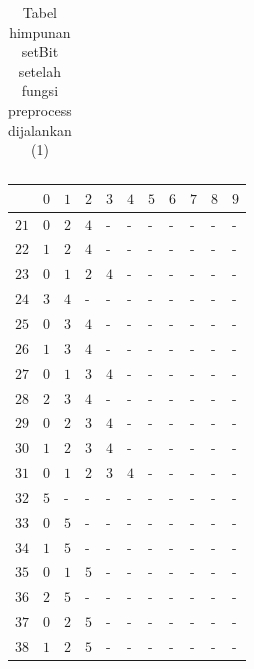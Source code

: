 \begin{appendices}
\begin{table}[H]
\begin{tabular} {|l|l|l|l|l|l|l|l|l|l|l|}
  	\end{tabular}\caption{Tabel himpunan setBit setelah fungsi preprocess dijalankan (1)}
  	\label{tab:setbit_1}
  \end{table}
  \begin{table}[H]
  	\centering
  	\begin{tabular} {|l|l|l|l|l|l|l|l|l|l|l|} \hline
  		\backslashbox{$Num$}{$index$} & $ 0 $ & $ 1 $ & $ 2 $ & $ 3 $ & $ 4 $ & $ 5 $ & $ 6 $ & $ 7 $ & $ 8 $ & $ 9 $ \\ \hline  		
  		$ 21 $ & $ 0 $ &$ 2 $ &$ 4 $ & - &  - &  - &  - &  - &  - &  -   \\ \hline
  		$ 22 $ & $ 1 $ &$ 2 $ &$ 4 $ & - &  - &  - &  - &  - &  - &  -   \\ \hline 
  		$ 23 $ & $ 0 $ &$ 1 $ &$ 2 $ &$ 4 $ & - &  - &  - &  - &  - &  -   \\ \hline
  		$ 24 $ & $ 3 $ &$ 4 $ & - &  - &  - &  - &  - &  - &  - &  -   \\ \hline  
  		$ 25 $ & $ 0 $ &$ 3 $ &$ 4 $ & - &  - &  - &  - &  - &  - &  -   \\ \hline
  		$ 26 $ & $ 1 $ &$ 3 $ &$ 4 $ & - &  - &  - &  - &  - &  - &  -   \\ \hline
  		$ 27 $ & $ 0 $ &$ 1 $ &$ 3 $ &$ 4 $ & - &  - &  - &  - &  - &  -   \\ \hline
  		$ 28 $ & $ 2 $ &$ 3 $ &$ 4 $ & - &  - &  - &  - &  - &  - &  -   \\ \hline
  		$ 29 $ & $ 0 $ &$ 2 $ &$ 3 $ &$ 4 $ & - &  - &  - &  - &  - &  -   \\ \hline
  		$ 30 $ & $ 1 $ &$ 2 $ &$ 3 $ &$ 4 $ & - &  - &  - &  - &  - &  -   \\ \hline
  		$ 31 $ & $ 0 $ &$ 1 $ &$ 2 $ &$ 3 $ &$ 4 $ & - &  - &  - &  - &  -   \\ \hline
  		$ 32 $ & $ 5 $ & - &  - &  - &  - &  - &  - &  - &  - &  -   \\ \hline
  		$ 33 $ & $ 0 $ &$ 5 $ & - &  - &  - &  - &  - &  - &  - &  -   \\ \hline
  		$ 34 $ & $ 1 $ &$ 5 $ & - &  - &  - &  - &  - &  - &  - &  -   \\ \hline
  		$ 35 $ & $ 0 $ &$ 1 $ &$ 5 $ & - &  - &  - &  - &  - &  - &  -   \\ \hline
  		$ 36 $ & $ 2 $ &$ 5 $ & - &  - &  - &  - &  - &  - &  - &  -   \\ \hline
  		$ 37 $ & $ 0 $ &$ 2 $ &$ 5 $ & - &  - &  - &  - &  - &  - &  -   \\ \hline
  		$ 38 $ & $ 1 $ &$ 2 $ &$ 5 $ & - &  - &  - &  - &  - &  - &  -   \\ \hline

\end{tabular}
\end{table}
\end{appendices}
